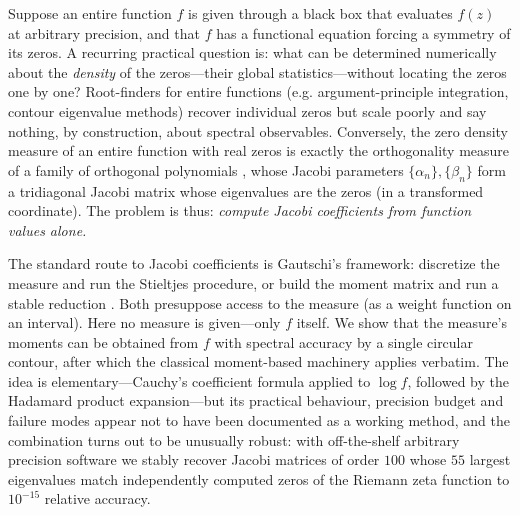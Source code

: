 \documentclass[11pt]{article}
\theoremstyle{definition}
\begin{document}
Suppose an entire function $f$ is given through a black box that
evaluates $f(z)$ at arbitrary precision, and that $f$ has a
functional equation forcing a symmetry of its zeros. A recurring
practical question is: what can be determined numerically about the
\emph{density} of the zeros---their global statistics---without
locating the zeros one by one? Root-finders for entire functions
(e.g. argument-principle integration, contour eigenvalue methods)
recover individual zeros but scale poorly and say nothing, by
construction, about spectral observables. Conversely, the zero
density measure of an entire function with real zeros is exactly the
orthogonality measure of a family of orthogonal polynomials
\cite{Stieltjes1894,ShohatTamarkin,Gautschi2004}, whose Jacobi
parameters $\{\alpha_n\},\{\beta_n\}$ form a tridiagonal Jacobi
matrix whose eigenvalues are the zeros (in a transformed coordinate).
The problem is thus: \emph{compute Jacobi coefficients from function
values alone.}

The standard route to Jacobi coefficients is Gautschi's framework:
discretize the measure and run the Stieltjes procedure, or build the
moment matrix and run a stable reduction
\cite{Gautschi1982,Gautschi2004}. Both presuppose access to the
measure (as a weight function on an interval). Here no measure is
given---only $f$ itself. We show that the measure's moments can be
obtained from $f$ with spectral accuracy by a single circular
contour, after which the classical moment-based machinery applies
verbatim. The idea is elementary---Cauchy's coefficient formula
applied to $\log f$, followed by the Hadamard product expansion---but
its practical behaviour, precision budget and failure modes appear
not to have been documented as a working method, and the combination
turns out to be unusually robust: with off-the-shelf arbitrary
precision software \cite{mpmath} we stably recover Jacobi matrices of
order $100$ whose $55$ largest eigenvalues match independently
computed zeros of the Riemann zeta function to $10^{-15}$ relative
accuracy.
\end{document}
